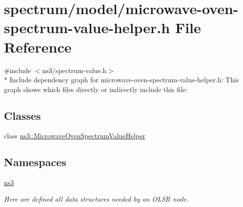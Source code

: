 \hypertarget{microwave-oven-spectrum-value-helper_8h}{}\section{spectrum/model/microwave-\/oven-\/spectrum-\/value-\/helper.h File Reference}
\label{microwave-oven-spectrum-value-helper_8h}
{\ttfamily \#include $<$ns3/spectrum-\/value.\+h$>$}\\*
Include dependency graph for microwave-\/oven-\/spectrum-\/value-\/helper.h\+:
This graph shows which files directly or indirectly include this file\+:
\subsection*{Classes}
\begin{DoxyCompactItemize}
\item 
class \hyperlink{classns3_1_1MicrowaveOvenSpectrumValueHelper}{ns3\+::\+Microwave\+Oven\+Spectrum\+Value\+Helper}
\end{DoxyCompactItemize}
\subsection*{Namespaces}
\begin{DoxyCompactItemize}
\item 
 \hyperlink{namespacens3}{ns3}
\begin{DoxyCompactList}\small\item\em Here are defined all data structures needed by an O\+L\+SR node. \end{DoxyCompactList}\end{DoxyCompactItemize}
